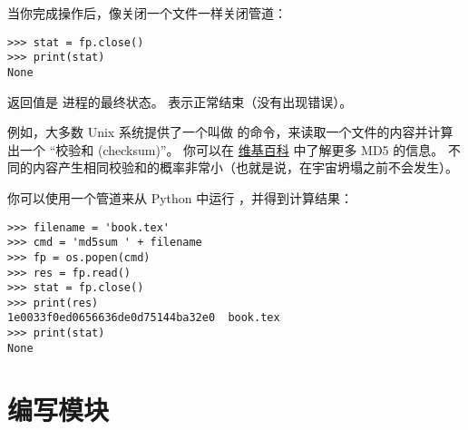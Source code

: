 {{{{{{{当你完成操作后，像关闭一个文件一样关闭管道：

  

\begin{lstlisting}
>>> stat = fp.close()
>>> print(stat)
None
\end{lstlisting}

%

返回值是  进程的最终状态。  表示正常结束（没有出现错误）。


例如，大多数 Unix 系统提供了一个叫做  的命令，来读取一个文件的内容并计算出一个 ``校验和 (checksum)''。
你可以在 \href{http://en.wikipedia.org/wiki/Md5}{维基百科} 中了解更多 MD5 的信息。
不同的内容产生相同校验和的概率非常小（也就是说，在宇宙坍塌之前不会发生）。
  


你可以使用一个管道来从 Python 中运行  ，并得到计算结果：

\begin{lstlisting}
>>> filename = 'book.tex'
>>> cmd = 'md5sum ' + filename
>>> fp = os.popen(cmd)
>>> res = fp.read()
>>> stat = fp.close()
>>> print(res)
1e0033f0ed0656636de0d75144ba32e0  book.tex
>>> print(stat)
None
\end{lstlisting}


\section{编写模块}
\label{modules}


}}}}}}}
